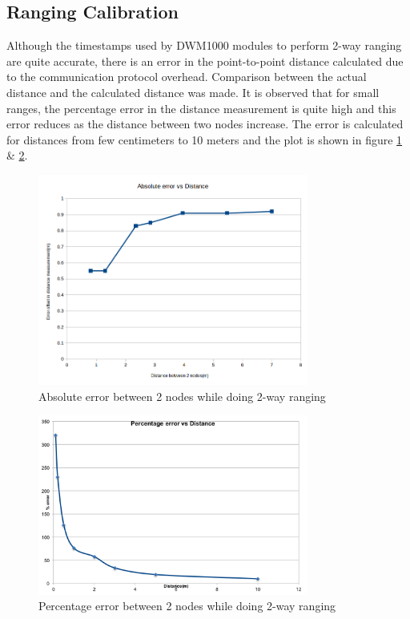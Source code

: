 \documentclass[journal,transmag]{IEEEtran}
\begin{document}
\subsection{Ranging Calibration}
Although the timestamps used by DWM1000 modules to perform 2-way ranging are quite accurate, there is an error in the point-to-point distance calculated due to the communication protocol overhead. Comparison between the actual distance and the calculated distance was made. It is observed that for small ranges, the percentage error in the distance measurement is quite high and this error reduces as the distance between two nodes increase. The error is calculated for distances from few centimeters to 10 meters and the plot is shown in figure \ref{abs_error} \& \ref{errorcalib}. 
\begin{figure}[!h]
\centering
\includegraphics[width=3.5in]{wsn_abs_error.png}
\caption{{Absolute error between 2 nodes while doing 2-way ranging}}
\label{abs_error}
\end{figure}

\begin{figure}[!h]
\centering
\includegraphics[width=3.5in]{errorcalibfig.png}
\caption{{Percentage error between 2 nodes while doing 2-way ranging}}
\label{errorcalib}
\end{figure}
\end{document}
